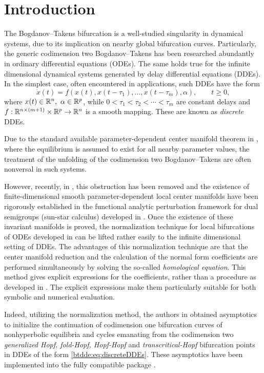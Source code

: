 \section{Introduction} 
The Bogdanov--Takens bifurcation is a well-studied singularity in dynamical
systems, due to its implication on nearby global bifurcation curves.
Particularly, the generic codimension two Bogdanov--Takens has been researched
abundantly in ordinary differential equations (ODEs). The same holds true for
the infinite dimensional dynamical systems generated by delay differential
equations (DDEs). In the simplest case, often encountered in applications, such
DDEs have the form
%
\begin{equation}
    \label{btdde:eq:discreteDDEs} 
    \dot{x}(t) = f(x(t),x(t-\tau_1),\ldots,x(t-\tau_m),\alpha),
    \qquad t \geq 0,
\end{equation}
%
where $x(t) \in \mathbb{R}^n,\ \alpha \in \mathbb{R}^p$, while $0 < \tau_1 < \tau_2 < \cdots
<\tau_m$ are constant delays and $f : \mathbb{R}^{n \times (m + 1)} \times \mathbb{R}^p \to
\mathbb{R}^n$ is a smooth mapping. These are known as \emph{discrete} DDEs.

Due to the standard available parameter-dependent center manifold theorem in
\cite{diekmann1995delay}, where the equilibrium is assumed to exist for all
nearby parameter values, the treatment of the unfolding of the codimension two
Bogdanov--Takens are often nonversal in such systems.

However, recently, in \cite{Switching2019}, this obstruction has been removed
and the existence of finite-dimensional smooth parameter-dependent local center
manifolds have been rigorously established in the functional analytic
perturbation framework for dual semigroups (sun-star calculus) developed
in \cite{Clement1987, Clement1988, Clement1989, Clement1989b}. Once the
existence of these invariant manifolds is proved, the normalization
technique for local bifurcations of ODEs developed in \cite{Kuznetsov1999} can
be lifted rather easily to the infinite dimensional setting of DDEs. The
advantages of this normalization technique are that the center manifold
reduction and the calculation of the normal form coefficients are performed
simultaneously by solving the so-called \emph{homological equation}. This
method gives explicit expressions for the coefficients, rather than a procedure
as developed in \cite{Faria1995201, Faria1995}. The explicit expressions make
them particularly suitable for both symbolic and numerical evaluation.

Indeed, utilizing the normalization method, the authors in \cite{Switching2019}
obtained asymptotics to initialize the continuation of codimension one
bifurcation curves of nonhyperbolic equilibria and cycles emanating from the
codimension two \emph{generalized Hopf, fold-Hopf, Hopf-Hopf} and
\emph{transcritical-Hopf} bifurcation points in DDEs of the form \cref{btdde:eq:discreteDDEs}.
These asymptotics have been implemented into the fully \OCTAVE compatible
\MATLAB package \DDEBIFTOOL \cite{DDEBIFTOOL,2014arXiv1406.7144S}. 

